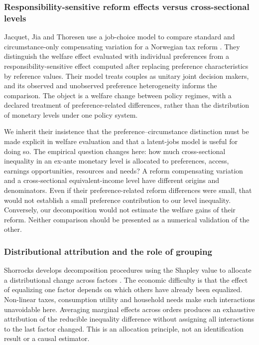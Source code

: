 \documentclass[11pt,a4paper]{article}
\begin{document}
\subsubsection{Responsibility-sensitive reform effects versus cross-sectional levels}\label{responsibility-sensitive-reform-effects-versus-cross-sectional-levels}

Jacquet, Jia and Thoresen use a job-choice model to compare standard and circumstance-only compensating variation for a Norwegian tax reform \citep[sections 3--5]{jacquet2026}. They distinguish the welfare effect evaluated with individual preferences from a responsibility-sensitive effect computed after replacing preference characteristics by reference values. Their model treats couples as unitary joint decision makers, and its observed and unobserved preference heterogeneity informs the comparison. The object is a welfare change between policy regimes, with a declared treatment of preference-related differences, rather than the distribution of monetary levels under one policy system.

We inherit their insistence that the preference--circumstance distinction must be made explicit in welfare evaluation and that a latent-jobs model is useful for doing so. The empirical question changes here: how much cross-sectional inequality in an ex-ante monetary level is allocated to preferences, access, earnings opportunities, resources and needs? A reform compensating variation and a cross-sectional equivalent-income level have different origins and denominators. Even if their preference-related reform differences were small, that would not establish a small preference contribution to our level inequality. Conversely, our decomposition would not estimate the welfare gains of their reform. Neither comparison should be presented as a numerical validation of the other.

\subsubsection{Distributional attribution and the role of grouping}\label{distributional-attribution-and-the-role-of-grouping}

Shorrocks develops decomposition procedures using the Shapley value to allocate a distributional change across factors \citep{shorrocks2013}. The economic difficulty is that the effect of equalizing one factor depends on which others have already been equalized. Non-linear taxes, consumption utility and household needs make such interactions unavoidable here. Averaging marginal effects across orders produces an exhaustive attribution of the reducible inequality difference without assigning all interactions to the last factor changed. This is an allocation principle, not an identification result or a causal estimator.
\end{document}
